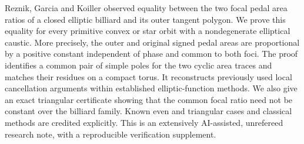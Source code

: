 Reznik, Garcia and Koiller observed equality between the two focal pedal
area ratios of a closed elliptic billiard and its outer tangent polygon.
We prove this equality for every primitive convex or star orbit with a
nondegenerate elliptical caustic. More precisely, the outer and original
signed pedal areas are proportional by a positive constant independent of
phase and common to both foci. The proof identifies a common pair of simple
poles for the two cyclic area traces and matches their residues on a compact
torus. It reconstructs previously used local cancellation arguments within
established elliptic-function methods. We also give an exact triangular
certificate showing that the common focal ratio need not be constant over
the billiard family. Known even and triangular cases and classical methods
are credited explicitly. This is an extensively AI-assisted, unrefereed
research note, with a reproducible verification supplement.
